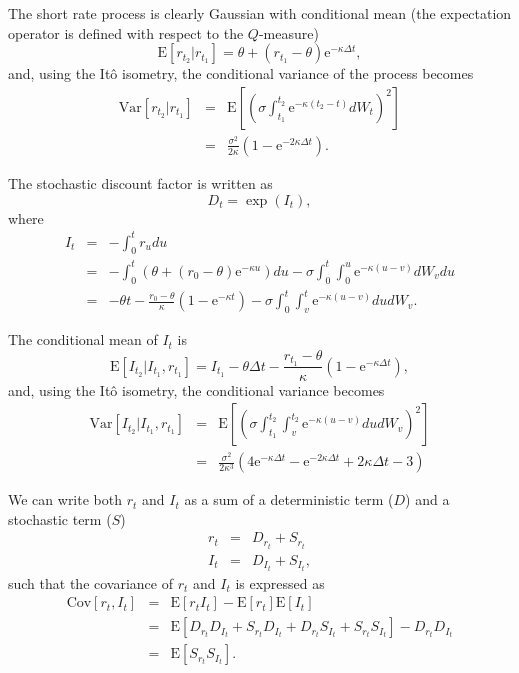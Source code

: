 \documentclass{report}
\newcommand{\E}{\mathrm{E}}
\newcommand{\Var}{\mathrm{Var}}
\newcommand{\Cov}{\mathrm{Cov}}
\newcommand{\e}{\text{e}}
\begin{document}
The short rate process is clearly Gaussian with conditional mean (the expectation operator is defined with respect to the $Q$-measure)
\begin{equation}
\E \left[ r_{t_2} | r_{t_1} \right] = \theta + \left( r_{t_1} - \theta \right) \e^{-\kappa \Delta t},
\end{equation}
and, using the It\^{o} isometry, the conditional variance of the process becomes
\begin{eqnarray}
\Var \left[ r_{t_2} | r_{t_1} \right] &=& \E \left[ \left( \sigma \int_{t_1}^{t_2} \e^{-\kappa \left(t_2 - t\right)} dW_t \right)^2 \right] \\
&=& \frac{\sigma^2}{2 \kappa} \left( 1 - \e^{-2 \kappa \Delta t}\right).
\end{eqnarray}

The stochastic discount factor is written as
\begin{equation}
D_{t} = \exp \left( I_t \right),
\end{equation}
where
\begin{eqnarray}
I_t &=& -\int_0^t r_u du \\
&=& - \int_0^t \left( \theta + \left( r_0 - \theta \right) \e^{-\kappa u } \right) du - \sigma \int_0^t \int_0^u \e^{-\kappa \left(u - v\right)} dW_v du \\
&=& - \theta t - \frac{r_0 - \theta}{\kappa} \left( 1 - \e^{-\kappa t} \right) - \sigma \int_0^t \int_v^t \e^{-\kappa \left(u - v\right)} du dW_v.
\end{eqnarray}

The conditional mean of $I_t$ is
\begin{equation}
\E \left[ I_{t_{2}} | I_{t_1}, r_{t_1} \right] = I_{t_1} - \theta \Delta t 
- \frac{r_{t_1} - \theta}{\kappa} \left( 1 - \e^{-\kappa \Delta t} \right),
\end{equation}
and, using the It\^{o} isometry, the conditional variance becomes
\begin{eqnarray}
\Var \left[ I_{t_{2}} | I_{t_1}, r_{t_1} \right] &=& \E \left[ \left( \sigma \int_{t_1}^{t_2} \int_v^{t_2} \e^{-\kappa \left(u - v\right)} du dW_v \right)^2 \right] \\
&=& \frac{\sigma^2}{2 \kappa^3} \left( 4 \e^{-\kappa \Delta t} - \e^{-2\kappa \Delta t} + 2 \kappa \Delta t - 3 \right)
\end{eqnarray}

We can write both $r_t$ and $I_t$ as a sum of a deterministic term ($D$) and a stochastic term ($S$)
\begin{eqnarray}
r_t &=& D_{r_t} + S_{r_t} \\
I_t &=& D_{I_t} + S_{I_t},
\end{eqnarray}
such that the covariance of $r_t$ and $I_t$ is expressed as
\begin{eqnarray}
\Cov \left[ r_t, I_t \right] &=& \E \left[ r_t I_t \right] - \E \left[ r_t \right] \E \left[ I_t \right] \\
&=& \E \left[ D_{r_t} D_{I_t} + S_{r_t} D_{I_t} + D_{r_t} S_{I_t} + S_{r_t} S_{I_t} \right] - D_{r_t} D_{I_t} \\
&=& \E \left[ S_{r_t} S_{I_t} \right].
\end{eqnarray}
\end{document}
